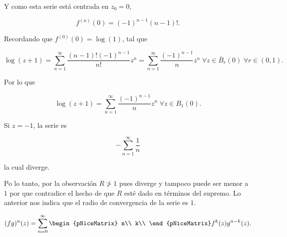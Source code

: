 \documentclass[../main.tex]{subfiles}
\begin{document}
\begin{example}
\begin{itemize}
            Y como esta serie está centrada en \(z_{0} = 0\),

            \begin{equation*}
                f^{(n)}(0) = (-1)^{n - 1}(n - 1)!.
            \end{equation*}

            Recordando que \(f^{(0)}(0) = \log(1)\), tal que

            \begin{equation*}
                \log(z + 1) = \sum_{n = 1}^{\infty}\dfrac{(n - 1)!(-1)^{n -
                1}}{n!}z^{n} = \sum_{n =
                1}^{\infty}\dfrac{(-1)^{n - 1}}{n}z^{n}\; \forall z\in
                \bar{B}_{r}(0)\; \forall r\in
                (0, 1).
            \end{equation*}

            Por lo que

            \begin{equation*}
                \log(z + 1) = \sum_{n = 1}^{\infty}\dfrac{(-1)^{n -
                1}}{n}z^{n}\; \forall z\in
                B_{1}(0).
            \end{equation*}

            \begin{remark}
                Si \(z = -1\), la serie es

                \begin{equation*}
                    -\sum_{n = 1}^{\infty}\dfrac{1}{n}
                \end{equation*}

                la cual diverge.
            \end{remark}

            Po lo tanto, por la observación \(R \ngtr 1\) pues diverge y
            tampoco puede ser menor a \(1\) por que contradice el hecho de
            que \(R\) esté dado en términos del supremo. Lo anterior  nos
            indica que el radio de convergencia de la serie es \(1\).
    \end{itemize}
\end{example}

\begin{lemma}
    \begin{equation*}
        (fg)^{n}(z) = \sum_{n = 0}^{\infty}
        \begin{pNiceMatrix}
            n\\
            k\\
        \end{pNiceMatrix}
        f^{k}(z)g^{n - k}(z).
    \end{equation*}
\end{lemma}
\end{document}
